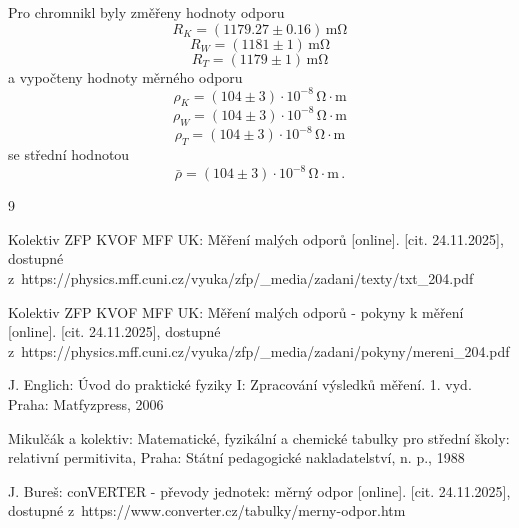 \documentclass{../concepts/prepareprotokol} %
\begin{document}
Pro chromnikl byly změřeny hodnoty odporu
\begin{equation*}
    R_K = (1179.27 \pm 0.16) \, \si{\milli\ohm}
\end{equation*}
\begin{equation*}
    R_W = (1181 \pm 1) \, \si{\milli\ohm}
\end{equation*}
\begin{equation*}
    R_T = (1179 \pm 1) \, \si{\milli\ohm}
\end{equation*}
a vypočteny hodnoty měrného odporu
\begin{equation*}
    \rho_K = (104 \pm 3) \cdot 10^{-8} \, \mathrm{\Omega \cdot m}
\end{equation*}
\begin{equation*}
    \rho_W = (104 \pm 3) \cdot 10^{-8} \, \mathrm{\Omega \cdot m}
\end{equation*}
\begin{equation*}
    \rho_T = (104 \pm 3) \cdot 10^{-8} \, \mathrm{\Omega \cdot m}
\end{equation*}
se střední hodnotou
\begin{equation*}
    \bar{\rho} = (104 \pm 3) \cdot 10^{-8} \, \mathrm{\Omega \cdot m} \, .
\end{equation*}

\begin{thebibliography}{9}

 Kolektiv ZFP KVOF MFF UK: Měření malých odporů [online]. [cit. 24.11.2025], dostupné z~https://physics.mff.cuni.cz/vyuka/zfp/\_media/zadani/texty/txt\_204.pdf

 Kolektiv ZFP KVOF MFF UK: Měření malých odporů - pokyny k měření [online]. [cit. 24.11.2025], dostupné
z~https://physics.mff.cuni.cz/vyuka/zfp/\_media/zadani/pokyny/mereni\_204.pdf

 J. Englich: Úvod do praktické fyziky I: Zpracování výsledků měření. 1. vyd. Praha: Matfyzpress, 2006

 Mikulčák a kolektiv: Matematické, fyzikální a chemické tabulky pro střední školy: relativní permitivita, Praha: Státní pedagogické nakladatelství, n. p., 1988

 J. Bureš: conVERTER - převody jednotek: měrný odpor [online]. [cit. 24.11.2025], dostupné z~https://www.converter.cz/tabulky/merny-odpor.htm

\end{thebibliography}
\end{document}
